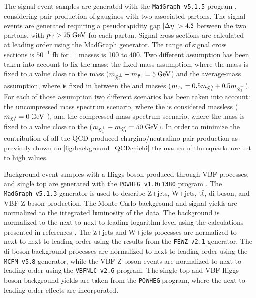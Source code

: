 The signal event samples are generated with the \texttt{MadGraph v5.1.5} program \cite{Alwall:2011uj}, considering pair production of gauginos with two associated partons. The signal events are generated requiring a pseudorapidity gap $|\Delta\eta| > 4.2$ between the two partons, with $p_{\text{T}} > 25\;\text{Ge}\kern-0.06667em\text{V}$ for each parton. Signal cross sections are calculated at leading order using the MadGraph generator. The range of signal cross sections is $50^{-1}$ fb for \charginopm = \neutralinotwo masses is 100 to 400\gev. Two different assumption has been taken into account to fix the \stau mass: the fixed-mass assumption, where the mass is fixed to a value close to the \charginopm mass ($m_{\tilde{\chi}^{\pm}_{1}} - m_{\tilde{\tau}_{1}} = 5\;\text{Ge}\kern-0.06667em\text{V}$) and the average-mass assumption, where is fixed in between the \charginopm and \neutralinoone masses ($m_{\tilde{\tau}_{1}} = 0.5 m_{\tilde{\chi}^{0}_{1}} + 0.5 m_{\tilde{\chi}^{\pm}_{1}} $). For each of those assumption two different scenarios has been taken into account: the uncompressed mass spectrum scenario, where the \neutralinoone is considered massless ($m_{\tilde{\chi}^{0}_{1}} = 0\;\text{Ge}\kern-0.06667em\text{V}$ ), and the compressed mass spectrum scenario, where the \neutralinoone mass is fixed to a value close to the \charginopm ($m_{\tilde{\chi}^{\pm}_{1}} - m_{\tilde{\chi}^{0}_{1}} = 50\;\text{Ge}\kern-0.06667em\text{V}$). In order to minimize the contribution of all the QCD produced chargino/neutralino pair production as previosly shown on \autoref{fig:background_QCDchichi} the masses of the squarks are set to high values.  

Background event samples with a Higgs boson produced through VBF processes, and single top are generated with the \texttt{POWHEG v1.0r1380} program \cite{Frixione:2007vw}. 
The \texttt{MadGraph v5.1.3} generator is used to describe Z+jets, W+jets, t$\bar{\text{t}}$, di-boson, and VBF Z boson production. The Monte Carlo background and signal yields are normalized to the integrated luminosity of the data. 
The \ttbar background is normalized to the next-to-next-to-leading-logarithm level using the calculations presented in references \cite{Czakon:2013goa,Melnikov:2006kv}. 
The Z+jets and W+jets processes are normalized to next-to-next-to-leading-order using the results from the \texttt{FEWZ v2.1} \cite{Gavin:2010az} generator. 
The di-boson background processes are normalized to next-to-leading-order using the \texttt{MCFM v5.8} \cite{Campbell:2010ff} generator, while the VBF Z boson events are normalized to next-to-leading order using the \texttt{VBFNLO v2.6} \cite{Arnold:2008rz,Arnold:2011wj}program. 
The single-top and VBF Higgs boson background yields are taken from the \texttt{POWHEG} program, where the next-to-leading order effects are incorporated.

